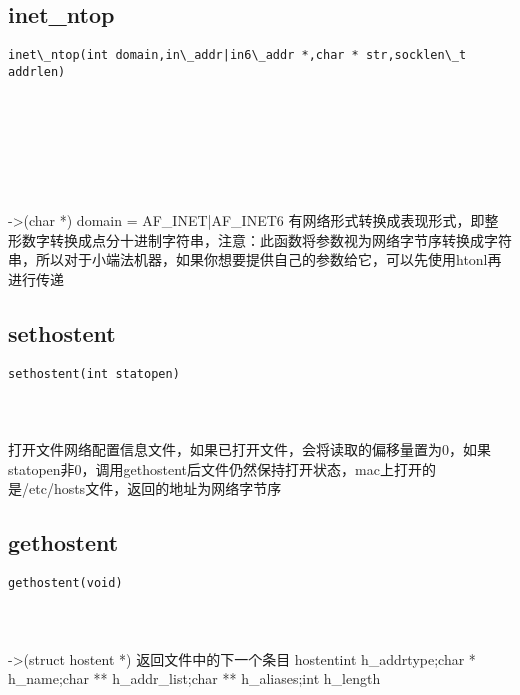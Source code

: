 \documentclass[10pt,a4paper]{article}
\begin{document}
\subsection{inet\_ntop}
\begin{spacing}{2.0}
\lstset{language=C,numbers=none}
\begin{lstlisting}
inet\_ntop(int domain,in\_addr|in6\_addr *,char * str,socklen\_t addrlen)
\end{lstlisting}
{\large\color[rgb]{0.2,0.4,0.6}{domain:}} \\
{\large\color[rgb]{0.2,0.4,0.6}{*:}} \\
{\large\color[rgb]{0.2,0.4,0.6}{str:}} \\
{\large\color[rgb]{0.2,0.4,0.6}{addrlen:}}
\paragraph{ \ \ }->(char *) domain = AF\_INET|AF\_INET6 有网络形式转换成表现形式，即整形数字转换成点分十进制字符串，注意：此函数将参数视为网络字节序转换成字符串，所以对于小端法机器，如果你想要提供自己的参数给它，可以先使用htonl再进行传递
\end{spacing}

\subsection{sethostent}
\begin{spacing}{2.0}
\lstset{language=C,numbers=none}
\begin{lstlisting}
sethostent(int statopen)
\end{lstlisting}
{\large\color[rgb]{0.2,0.4,0.6}{statopen:}}
\paragraph{ \ \ }打开文件网络配置信息文件，如果已打开文件，会将读取的偏移量置为0，如果statopen非0，调用gethostent后文件仍然保持打开状态，mac上打开的是/etc/hosts文件，返回的地址为网络字节序
\end{spacing}

\subsection{gethostent}
\begin{spacing}{2.0}
\lstset{language=C,numbers=none}
\begin{lstlisting}
gethostent(void)
\end{lstlisting}
{\large\color[rgb]{0.2,0.4,0.6}{void:}}
\paragraph{ \ \ }->(struct hostent *) 返回文件中的下一个条目 hostent{int h\_addrtype;char * h\_name;char ** h\_addr\_list;char ** h\_aliases;int h\_length}
\end{spacing}
\end{document}

